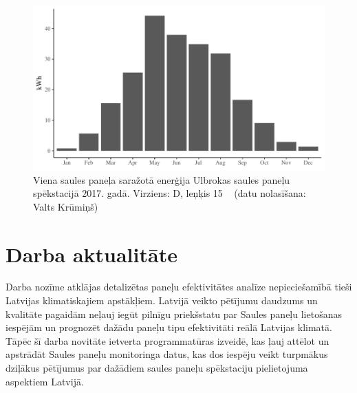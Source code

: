 \begin{figure}[h]
  \centering
  \includegraphics[width=\linewidth]{figures/misc/ulbroka1.pdf}
  \caption{Viena saules paneļa saražotā enerģija Ulbrokas saules paneļu spēkstacijā 2017. gadā. Virziens: D, leņķis 15 \textdegree ~\cite{fronius} (datu nolasīšana: Valts Krūmiņš)}
  \label{fig:ulbroka}
\end{figure}

\section{Darba aktualitāte}


Darba nozīme atklājas detalizētas paneļu efektivitātes analīze nepieciešamībā tieši Latvijas klimatiskajiem apstākļiem. Latvijā veikto pētījumu daudzums un kvalitāte pagaidām neļauj iegūt pilnīgu priekšstatu par Saules paneļu lietošanas iespējām un prognozēt dažādu paneļu tipu efektivitāti reālā Latvijas klimatā. Tāpēc šī darba novitāte ietverta programmatūras izveidē, kas ļauj attēlot un apstrādāt Saules paneļu monitoringa datus, kas dos iespēju veikt turpmākus dziļākus pētījumus par dažādiem saules paneļu spēkstaciju pielietojuma aspektiem Latvijā.

